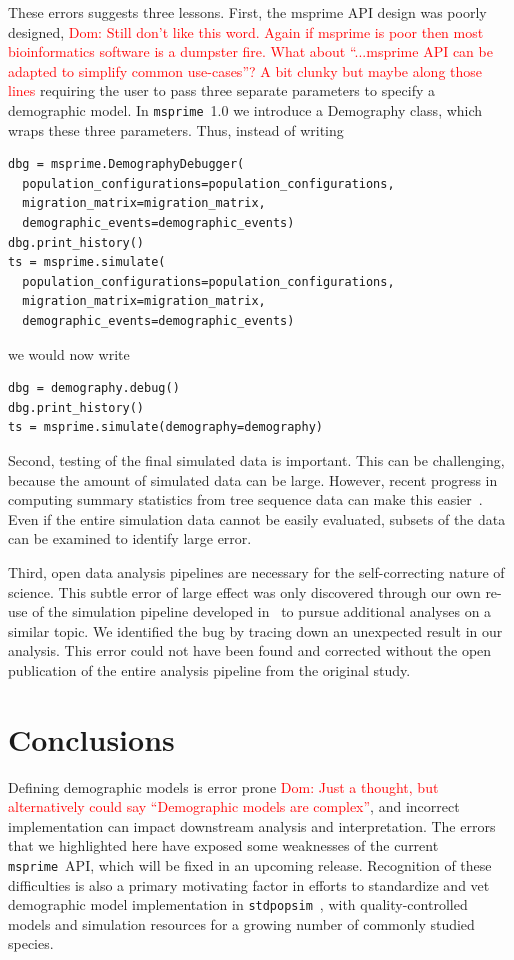 \documentclass{article}
\newcommand{\msprime}[0]{\texttt{msprime}}
\newcommand{\stdpopsim}[0]{\texttt{stdpopsim}}
\newcommand{\dncomment}[1]{{\textcolor{red}{Dom: #1}}}
\begin{document}
These errors suggests three lessons. 
First, the msprime API design was poorly designed, 
\dncomment{Still don't like this word. Again if msprime is poor then most bioinformatics 
software is a dumpster fire. What about ``...msprime API can be adapted to 
simplify common use-cases''? A bit clunky but maybe along those lines
}
requiring the user to pass 
three separate parameters to specify a demographic model. 
In \msprime\ 1.0 we introduce
a Demography class, which wraps these three parameters.
Thus, instead of writing
\begin{lstlisting}[frame=single]
dbg = msprime.DemographyDebugger(
  population_configurations=population_configurations,
  migration_matrix=migration_matrix,
  demographic_events=demographic_events)
dbg.print_history()
ts = msprime.simulate(
  population_configurations=population_configurations,
  migration_matrix=migration_matrix,
  demographic_events=demographic_events)
\end{lstlisting}
we would now write
\begin{lstlisting}[frame=single]
dbg = demography.debug()
dbg.print_history()
ts = msprime.simulate(demography=demography)
\end{lstlisting}

Second, testing of the final simulated data is important. This can be challenging, 
because the amount of simulated data can be large. However, recent progress in 
computing summary statistics from tree sequence data can make this easier~\cite{ralph2020efficiently}. 
Even if the entire simulation data cannot be easily evaluated, subsets of the data 
can be examined to identify large error.  

Third, open data analysis pipelines are necessary for the self-correcting nature of science. 
This subtle error of large effect was only discovered through our own re-use of
the simulation pipeline developed in~\citep{martin2017human} to pursue 
additional analyses on a similar topic. We identified the bug by tracing down an unexpected 
result in our analysis. This error could not have been found and corrected without the open
publication of the entire analysis pipeline from the original study.

\section{Conclusions}

Defining demographic models is error prone \dncomment{Just a thought, but alternatively could say 
``Demographic models are complex''}, and incorrect implementation can  
impact downstream analysis and interpretation. The errors that we highlighted here have 
exposed some weaknesses of the current \msprime\ API, which will be fixed in an 
upcoming release. Recognition of these difficulties is also a 
primary motivating factor in efforts to standardize and vet demographic model 
implementation in \stdpopsim~\cite{adrion2019community}, with quality-controlled 
models and simulation resources for a growing number of commonly studied species.
\end{document}
